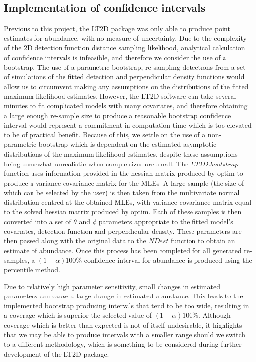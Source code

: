 \documentclass[11pt]{article}
\begin{document}
\begin{multicols}{2}
\subsection{Implementation of confidence intervals}
Previous to this project, the LT2D package was only able to produce point estimates for abundance, with no measure of uncertainty. Due to the complexity of the 2D detection function distance sampling likelihood, analytical calculation of confidence intervals is infeasible, and therefore we consider the use of a bootstrap. The use of a parametric bootstrap, re-sampling detections from a set of simulations of the fitted detection and perpendicular density functions would allow us to circumvent making any assumptions on the distributions of the fitted maximum likelihood estimates. However, the LT2D software can take several minutes to fit complicated models with many covariates, and therefore obtaining a large enough re-sample size to produce a reasonable bootstrap confidence interval would represent a commitment in computation time which is too elevated to be of practical benefit.  Because of this, we settle on the use of a non-parametric bootstrap which is dependent on the estimated asymptotic distributions of the maximum likelihood estimates, despite these assumptions being somewhat unrealistic when sample sizes are small.  The $LT2D.bootstrap$ function uses information provided in the hessian matrix produced by optim to produce a variance-covariance matrix for the MLEs. A large sample (the size of which can be selected by the user) is then taken from  the multivariate normal distribution centred at the obtained MLEs, with variance-covariance matrix equal to the solved hessian matrix produced by optim. Each of these samples is then converted into a set of $\theta$ and $\phi$ parameters appropriate to the fitted model's covariates, detection function and perpendicular density. These parameters are then passed along with the original data to the $NDest$ function to obtain an estimate of abundance. Once this process has been completed for all generated re-samples, a $(1-\alpha) 100\%$ confidence interval for abundance is produced using the percentile method. 

Due to relatively high parameter sensitivity, small changes in estimated parameters can cause a large change in estimated abundance. This leads to the implemented bootstrap producing intervals that tend to be too wide, resulting in a coverage which is superior the selected value of $(1-\alpha) 100\%$. Although coverage which is better than expected is not of itself undesirable, it highlights that we may be able to produce intervals with a smaller range should we switch to a different methodology, which is something to be considered during further development of the LT2D package. 


\end{multicols}
\end{document}
